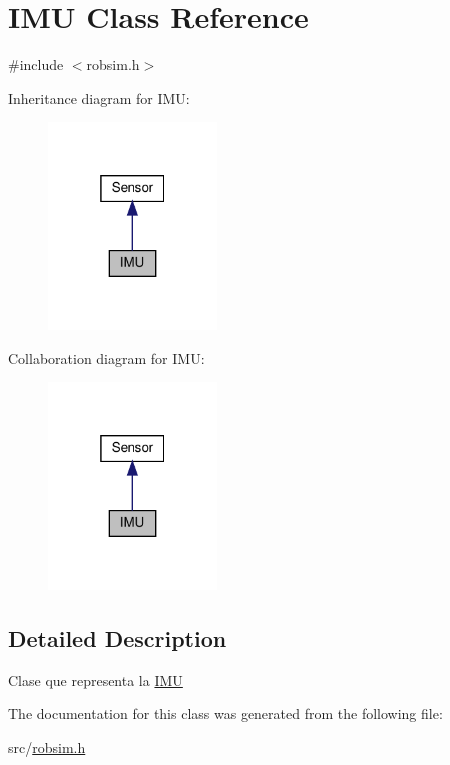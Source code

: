 \hypertarget{classIMU}{}\section{I\+MU Class Reference}
\label{classIMU}


{\ttfamily \#include $<$robsim.\+h$>$}



Inheritance diagram for I\+MU\+:\nopagebreak
\begin{figure}[H]
\begin{center}
\leavevmode
\includegraphics[width=127pt]{classIMU__inherit__graph}
\end{center}
\end{figure}


Collaboration diagram for I\+MU\+:\nopagebreak
\begin{figure}[H]
\begin{center}
\leavevmode
\includegraphics[width=127pt]{classIMU__coll__graph}
\end{center}
\end{figure}


\subsection{Detailed Description}
Clase que representa la \hyperlink{classIMU}{I\+MU} 

The documentation for this class was generated from the following file\+:\begin{DoxyCompactItemize}
\item 
src/\hyperlink{robsim_8h}{robsim.\+h}\end{DoxyCompactItemize}
